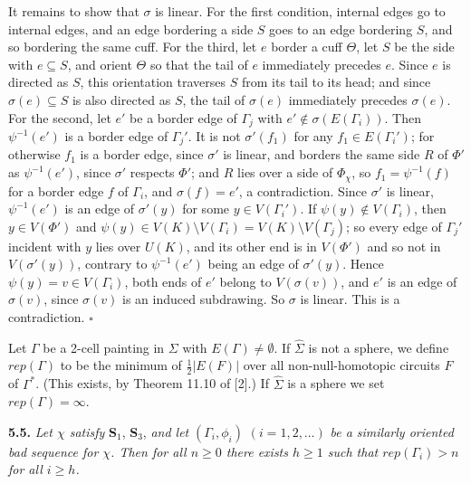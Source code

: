 {It remains to show that $\sigma$ is linear. For the first condition, internal edges go to internal edges, and an edge bordering a side $S$ goes to an edge bordering $S$, and so bordering the same cuff. For the third, let $e$ border a cuff $\Theta$, let $S$ be the side with $e \subseteq S$, and orient $\Theta$ so that the tail of $e$ immediately precedes $e$. Since $e$ is directed as $S$, this orientation traverses $S$ from its tail to its head; and since $\sigma(e) \subseteq S$ is also directed as $S$, the tail of $\sigma(e)$ immediately precedes $\sigma(e)$. For the second, let $e'$ be a border edge of $\Gamma_j$ with $e' \notin \sigma(E(\Gamma_i))$. Then $\psi^{-1}(e')$ is a border edge of $\Gamma_j'$. It is not $\sigma'(f_1)$ for any $f_1 \in E(\Gamma_i')$; for otherwise $f_1$ is a border edge, since $\sigma'$ is linear, and borders the same side $R$ of $\Phi'$ as $\psi^{-1}(e')$, since $\sigma'$ respects $\Phi'$; and $R$ lies over a side of $\Phi_\chi$, so $f_1 = \psi^{-1}(f)$ for a border edge $f$ of $\Gamma_i$, and $\sigma(f) = e'$, a contradiction. Since $\sigma'$ is linear, $\psi^{-1}(e')$ is an edge of $\sigma'(y)$ for some $y \in V(\Gamma_i')$. If $\psi(y) \notin V(\Gamma_i)$, then $y \in V(\Phi')$ and $\psi(y) \in V(K) \setminus V(\Gamma_i) = V(K) \setminus V(\Gamma_j)$; so every edge of $\Gamma_j'$ incident with $y$ lies over $U(K)$, and its other end is in $V(\Phi')$ and so not in $V(\sigma'(y))$, contrary to $\psi^{-1}(e')$ being an edge of $\sigma'(y)$. Hence $\psi(y) = v \in V(\Gamma_i)$, both ends of $e'$ belong to $V(\sigma(v))$, and $e'$ is an edge of $\sigma(v)$, since $\sigma(v)$ is an induced subdrawing. So $\sigma$ is linear.} This is a contradiction. $\square$

Let $\Gamma$ be a 2-cell painting in $\Sigma$ with $E(\Gamma) \ne \emptyset$. If $\hat{\Sigma}$ is not a sphere, we define $rep(\Gamma)$ to be the minimum of $\frac{1}{2}|E(F)|$ over all non-null-homotopic circuits $F$ of $\Gamma^*$. (This exists, by Theorem 11.10 of [2].) If $\hat{\Sigma}$ is a sphere we set $rep(\Gamma) = \infty$.

\textbf{5.5.} \textit{Let $\chi$ satisfy} \textbf{S}$_1$, \textbf{S}$_3$, \textit{and let} $(\Gamma_i, \phi_i)$ $(i = 1, 2, \dots)$ \textit{be a similarly oriented bad sequence for $\chi$. Then for all $n \ge 0$ there exists $h \ge 1$ such that $rep(\Gamma_i) > n$ for all $i \ge h$.}

